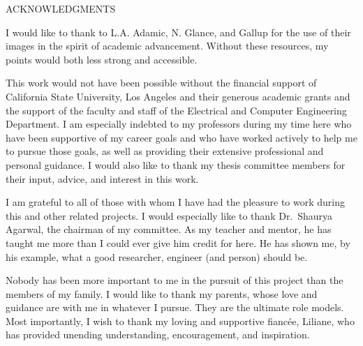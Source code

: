 \documentclass[12pt,openany,oneside]{book}
\theoremstyle{definition}
\newcounter{members}%
\newcommand{\makeacknowledgments}{
\newpage
\addcontentsline{toc}{part}{Acknowledgments}
\begin{center}
ACKNOWLEDGMENTS\\ 
\end{center}\par}
\begin{document}

\makeacknowledgments

I would like to thank to L.A. Adamic, N. Glance, and Gallup for the use of their images in the spirit of academic advancement. Without these resources, my points would both less strong and accessible.

This work would	not	have been possible without the financial support of	California State University, Los Angeles and their generous academic grants and the support of the faculty and staff of the Electrical and Computer Engineering Department. I am especially indebted	to my professors during my time here who have been supportive	of my career goals and who have worked actively to help me to pursue those goals, as well as providing their extensive professional and personal guidance. I would also like to thank my thesis committee members for their input, advice, and interest in this work. 

I am grateful to all of	those with whom I have had the pleasure to work during this	and	other related projects.	I would especially like to thank Dr.~Shaurya Agarwal, the	chairman of	my committee. As my	teacher	and	mentor,	he has taught me more than I could ever give him credit for here. He has shown me, by his example, what a	good researcher, engineer (and person) should be.

Nobody has been	more important to me in	the	pursuit	of this	project	than the members	of	my	family.	I would	like to	thank	my	parents, whose love	and	guidance are with me in	whatever I pursue. They	are	the ultimate role models.	Most importantly, I wish to	thank my loving	and	supportive fianc\'ee, Liliane, who has	provided unending understanding, encouragement, and inspiration.

%
%
%
%
\end{document}
